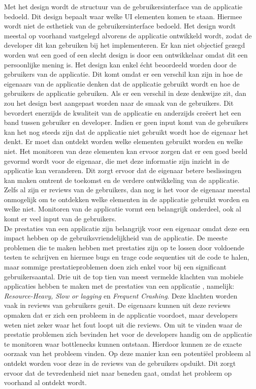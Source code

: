 Met het design wordt de structuur van de gebruikersinterface van de applicatie bedoeld. Dit design bepaalt waar welke UI elementen komen te staan. Hiermee wordt niet de esthetiek van de gebruikersinterface bedoeld.
Het design wordt meestal op voorhand vastgelegd alvorens de applicatie ontwikkeld wordt, zodat de developer dit kan gebruiken bij het implementeren. Er kan niet objectief gezegd worden wat een goed of een slecht design is door een ontwikkelaar omdat dit een persoonlijke mening is. Het design kan enkel \'echt beoordeeld worden door de gebruikers van de applicatie. Dit komt omdat er een verschil kan zijn in hoe de eigenaars van de applicatie denken dat de applicatie gebruikt wordt en hoe de gebruikers de applicatie gebruiken. Als er een verschil in deze denkwijze zit, dan zou het design best aangepast worden naar de smaak van de gebruikers. Dit bevordert enerzijds de kwaliteit van de applicatie en anderzijds cre\"eert het een band tussen gebruiker en developer. Indien er geen input komt van de gebruikers kan het nog steeds zijn dat de applicatie niet gebruikt wordt hoe de eigenaar het denkt. Er moet dan ontdekt worden welke elementen gebruikt worden en welke niet. Het monitoren van deze elementen kan ervoor zorgen dat er een goed beeld gevormd wordt voor de eigenaar, die met deze informatie zijn inzicht in de applicatie kan veranderen. Dit zorgt ervoor dat de eigenaar betere beslissingen kan maken omtrent de toekomst en de verdere ontwikkeling van de applicatie. Zelfs al zijn er reviews van de gebruikers, dan nog is het voor de eigenaar meestal onmogelijk om te ontdekken welke elementen in de applicatie gebruikt worden en welke niet. Monitoren van de applicatie vormt een belangrijk onderdeel, ook al komt er veel input van de gebruikers. \\


De prestaties van een applicatie zijn belangrijk voor een eigenaar omdat deze een impact hebben op de gebruiksvriendelijkheid van de applicatie. De meeste problemen die te maken hebben met prestaties zijn op te lossen door voldoende testen te schrijven en hiermee bugs en trage code sequenties uit de code te halen, maar sommige prestatieproblemen doen zich enkel voor bij een significant gebruikersaantal. Drie uit de top tien van meest vermelde klachten van mobiele applicaties hebben te maken met de prestaties van een applicatie \cite{AppSucks}, namelijk: \textit{Resource-Heavy, Slow or lagging} en \textit{Frequent Crashing}. Deze klachten worden vaak in reviews van gebruikers geuit. De eigenaars kunnen uit deze reviews opmaken dat er zich een probleem in de applicatie voordoet, maar developers weten niet zeker waar het fout loopt uit die reviews. Om uit te vinden waar de prestatie problemen zich bevinden het voor de developers handig om de applicatie te monitoren waar bottlenecks kunnen ontstaan. Hierdoor kunnen ze de exacte oorzaak van het probleem vinden. Op deze manier kan een potenti\"eel probleem al ontdekt worden voor deze in de reviews van de gebruikers opduikt. Dit zorgt ervoor dat de tevredenheid niet naar beneden gaat, omdat het probleem op voorhand al ontdekt wordt. \\



